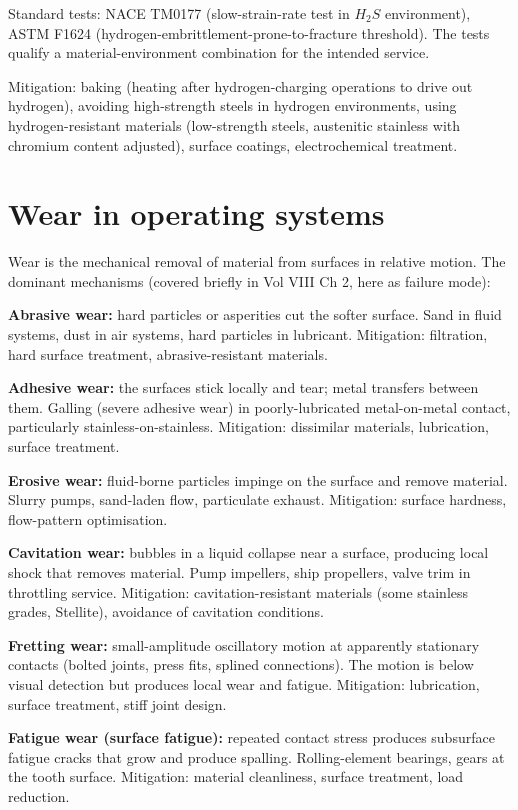 Standard tests: NACE TM0177 (slow-strain-rate test in $H_2S$ environment), ASTM F1624 (hydrogen-embrittlement-prone-to-fracture threshold). The tests qualify a material-environment combination for the intended service.

Mitigation: baking (heating after hydrogen-charging operations to drive out hydrogen), avoiding high-strength steels in hydrogen environments, using hydrogen-resistant materials (low-strength steels, austenitic stainless with chromium content adjusted), surface coatings, electrochemical treatment.

\section{Wear in operating systems}

Wear is the mechanical removal of material from surfaces in relative motion. The dominant mechanisms (covered briefly in Vol VIII Ch 2, here as failure mode):

\textbf{Abrasive wear:} hard particles or asperities cut the softer surface. Sand in fluid systems, dust in air systems, hard particles in lubricant. Mitigation: filtration, hard surface treatment, abrasive-resistant materials.

\textbf{Adhesive wear:} the surfaces stick locally and tear; metal transfers between them. Galling (severe adhesive wear) in poorly-lubricated metal-on-metal contact, particularly stainless-on-stainless. Mitigation: dissimilar materials, lubrication, surface treatment.

\textbf{Erosive wear:} fluid-borne particles impinge on the surface and remove material. Slurry pumps, sand-laden flow, particulate exhaust. Mitigation: surface hardness, flow-pattern optimisation.

\textbf{Cavitation wear:} bubbles in a liquid collapse near a surface, producing local shock that removes material. Pump impellers, ship propellers, valve trim in throttling service. Mitigation: cavitation-resistant materials (some stainless grades, Stellite), avoidance of cavitation conditions.

\textbf{Fretting wear:} small-amplitude oscillatory motion at apparently stationary contacts (bolted joints, press fits, splined connections). The motion is below visual detection but produces local wear and fatigue. Mitigation: lubrication, surface treatment, stiff joint design.

\textbf{Fatigue wear (surface fatigue):} repeated contact stress produces subsurface fatigue cracks that grow and produce spalling. Rolling-element bearings, gears at the tooth surface. Mitigation: material cleanliness, surface treatment, load reduction.

